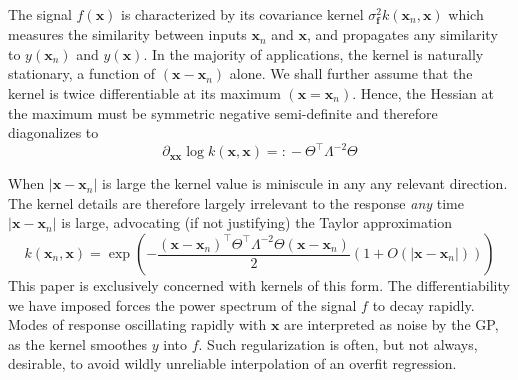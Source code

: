 \documentclass[preprint,12pt]{elsarticle}
\newcommand*{\M}[1]{\ensuremath{#1}\xspace}
\newcommand*{\vr}[1]{\M{\mathbf{#1}}}
\newcommand*{\deqr}{\M{=\mathrel{\mathop:}}}
\newcommand*{\modulus}[1]{\M{\left\lvert#1\right\rvert}}
\begin{document}
            The signal $f(\vr{x})$ is characterized by its covariance kernel $\sigma^{2}_\vr{f} k(\vr{x}_{n},\vr{x})$ which measures the similarity between inputs $\vr{x}_{n}$ and $\vr{x}$, and propagates any similarity to $y(\vr{x}_{n})$ and $y(\vr{x})$. In the majority of applications, the kernel is naturally stationary, a function of $(\vr{x}-\vr{x}_{n})$ alone. We shall further assume that the kernel is twice differentiable at its maximum $(\vr{x}=\vr{x}_{n})$. Hence, the Hessian at the maximum must be symmetric negative semi-definite and therefore diagonalizes to
            \begin{equation*}
                \partial_{\vr{x}\vr{x}} \log k(\vr{x},\vr{x}) \deqr -\Theta^{\intercal}\Lambda^{-2}\Theta
            \end{equation*}

            When $\modulus{\vr{x}-\vr{x}_{n}}$ is large the kernel value is miniscule in any any relevant direction. The kernel details are therefore largely irrelevant to the response \emph{any} time $\modulus{\vr{x}-\vr{x}_{n}}$ is large, advocating (if not justifying) the Taylor approximation
            \begin{equation*}
                k(\vr{x}_{n},\vr{x}) = 
                \exp \left(-\frac
                    {(\vr{x}-\vr{x}_{n})^{\intercal} \Theta^{\intercal}\Lambda^{-2}\Theta (\vr{x}-\vr{x}_{n})}{2}
                    \left(1+O(\modulus{\vr{x}-\vr{x}_{n}})\right)
                \right)             
            \end{equation*}
            This paper is exclusively concerned with kernels of this form. The differentiability we have imposed forces the power spectrum of the signal $f$ to decay rapidly. 
            Modes of response oscillating rapidly with $\vr{x}$ are interpreted as noise by the GP, as the kernel smoothes $y$ into $f$. Such regularization is often, but not always, desirable, to avoid wildly unreliable interpolation of an overfit regression.
\end{document}
